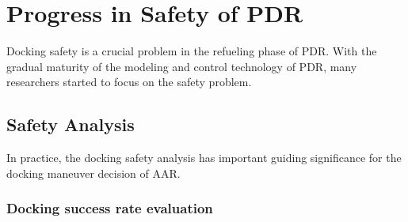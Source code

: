 \section{Progress in Safety of PDR}

Docking safety is a crucial problem in the refueling phase of PDR.
With the gradual maturity of the modeling and control technology of
PDR, many researchers started to focus on the safety problem.

\subsection{Safety Analysis}

In practice, the docking safety analysis has important guiding significance
for the docking maneuver decision of AAR. 

\subsubsection{Docking success rate evaluation}

